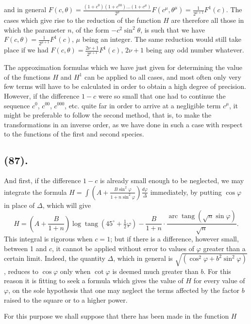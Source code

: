 \documentclass{article}
\begin{document}
and in general $F(c,\theta)=\frac{(1+c^{0})(1+c^{00})\ldots(1+c^{\mu})}{2^{\mu}}F(c^{\mu},\theta^{\mu})=\frac{1}{2^{\mu+1}}F^{1}(c)$. The cases which give rise to the reduction of the function $H$ are therefore all those in which the parameter $n$, of the form $-c^{2}\sin^{2}\theta$, is such that we have $F(c,\theta)=\frac{1}{2^{\mu+1}}F^{1}(c)$, $\mu$ being an integer. The same reduction would still take place if we had $F(c,\theta)=\frac{2\nu+1}{2^{\mu+1}}F^{1}(c)$, $2\nu+1$ being any odd number whatever.

The approximation formulas which we have just given for determining the value of the functions $H$ and $H^{1}$ can be applied to all cases, and most often only very few terms will have to be calculated in order to obtain a high degree of precision. However, if the difference $1-c$ were so small that one had to continue the sequence $c^{0}$, $c^{00}$, $c^{000}$, etc. quite far in order to arrive at a negligible term $c^{\mu}$, it might be preferable to follow the second method, that is, to make the transformations in an inverse order, as we have done in such a case with respect to the functions of the first and second species.

\subsection*{(87).}

And first, if the difference $1-c$ is already small enough to be neglected, we may integrate the formula $H=\displaystyle\int\left(A+\frac{B\sin^{2}\varphi}{1+n\sin^{2}\varphi}\right)\frac{d\varphi}{\Delta}$ immediately, by putting $\cos\varphi$ in place of $\Delta$, which will give
\[ H=\left(A+\frac{B}{1+n}\right)\log\operatorname{tang}(45^{\circ}+\tfrac{1}{2}\varphi)-\frac{B}{1+n}\cdot\frac{\operatorname{arc}\operatorname{tang}(\sqrt{n}\sin\varphi)}{\sqrt{n}}. \]
This integral is rigorous when $c=1$; but if there is a difference, however small, between 1 and $c$, it cannot be applied without error to values of $\varphi$ greater than a certain limit. Indeed, the quantity $\Delta$, which in general is $\sqrt{(\cos^{2}\varphi+b^{2}\sin^{2}\varphi)}$, reduces to $\cos\varphi$ only when $\cot\varphi$ is deemed much greater than $b$. For this reason it is fitting to seek a formula which gives the value of $H$ for every value of $\varphi$, on the sole hypothesis that one may neglect the terms affected by the factor $b$ raised to the square or to a higher power.

For this purpose we shall suppose that there has been made in the function $H$
\end{document}
